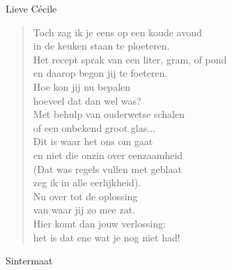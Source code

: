 \documentclass[12pt]{brief}
\begin{document}
\begin{letter}{Lieve C\'ecile}
\begin{verse}
Toch zag ik je eens op een koude avond\\
in de keuken staan te ploeteren.\\
Het recept sprak van een liter, gram, of pond\\
en daarop begon jij te foeteren.\\
Hoe kon jij nu bepalen\\
hoeveel dat dan wel was?\\
Met behulp van ouderwetse schalen\\
of een onbekend groot glas...\\[1.5em]

Dit is waar het ons om gaat\\
en niet die onzin over eenzaamheid\\
(Dat was regels vullen met geblaat\\
zeg ik in alle eerlijkheid).\\
Nu over tot de oplossing\\
van waar jij zo mee zat.\\
Hier komt dan jouw verlossing:\\
het is dat ene wat je nog niet had!\\

\end{verse}


Sintermaat


\closing{}

\end{letter}
\end{document}
